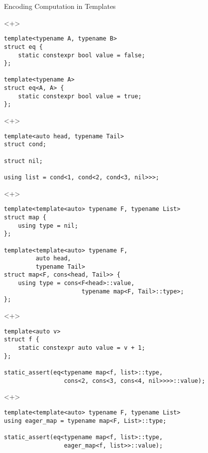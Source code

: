\documentclass[table]{beamer}
\begin{document}
\begin{frame}[fragile]{Encoding Computation in Templates}
  \begin{onlyenv}<+>
    \begin{verbatim}
template<typename A, typename B>
struct eq {
    static constexpr bool value = false;
};

template<typename A>
struct eq<A, A> {
    static constexpr bool value = true;
};
    \end{verbatim}
  \end{onlyenv}

  \begin{onlyenv}<+>
    \begin{verbatim}
template<auto head, typename Tail>
struct cond;

struct nil;

using list = cond<1, cond<2, cond<3, nil>>>;
    \end{verbatim}
  \end{onlyenv}

  \begin{onlyenv}<+>
    \begin{verbatim}
template<template<auto> typename F, typename List>
struct map {
    using type = nil;
};

template<template<auto> typename F,
         auto head,
         typename Tail>
struct map<F, cons<head, Tail>> {
    using type = cons<F<head>::value,
                      typename map<F, Tail>::type>;
};
    \end{verbatim}
  \end{onlyenv}

  \begin{onlyenv}<+>
    \begin{verbatim}
template<auto v>
struct f {
    static constexpr auto value = v + 1;
};

static_assert(eq<typename map<f, list>::type,
                 cons<2, cons<3, cons<4, nil>>>>::value);
    \end{verbatim}
  \end{onlyenv}

  \begin{onlyenv}<+>
    \begin{verbatim}
template<template<auto> typename F, typename List>
using eager_map = typename map<F, List>::type;

static_assert(eq<typename map<f, list>::type,
                 eager_map<f, list>>::value);
    \end{verbatim}
  \end{onlyenv}
\end{frame}
\end{document}
